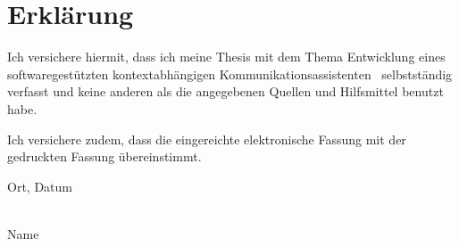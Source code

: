 \chapter*{Erklärung}
\label{ch:erklaerung}

Ich versichere hiermit, dass ich meine Thesis mit dem Thema
\glqq Entwicklung eines softwaregestützten kontextabhängigen Kommunikationsassistenten \grqq
\ selbstständig verfasst und keine anderen als die angegebenen Quellen und Hilfsmittel benutzt habe.

Ich versichere zudem, dass die eingereichte elektronische Fassung mit der gedruckten Fassung übereinstimmt.

\vspace{1.5cm}
Ort, Datum

\vspace{0.5cm}
\underline{\hspace{10cm}}\\
Name